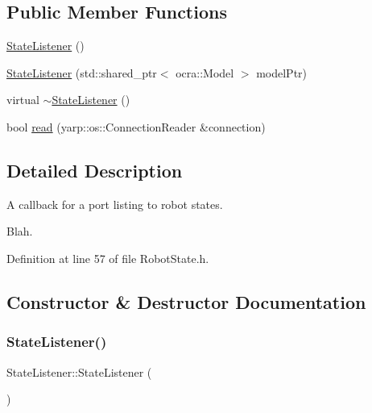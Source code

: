 \subsection*{Public Member Functions}
\begin{DoxyCompactItemize}
\item 
\hyperlink{classocra__recipes_1_1StateListener_ab2d5128398eeb9990f34a633e9a4e181}{State\+Listener} ()
\item 
\hyperlink{classocra__recipes_1_1StateListener_a6861fabf2b226ce71ba2bcfa766a4538}{State\+Listener} (std\+::shared\+\_\+ptr$<$ ocra\+::\+Model $>$ model\+Ptr)
\item 
virtual \hyperlink{classocra__recipes_1_1StateListener_a84961512f9533cc039ca2deefbabbb73}{$\sim$\+State\+Listener} ()
\item 
bool \hyperlink{classocra__recipes_1_1StateListener_a10196cebd253c4b98fb39371c95cc68a}{read} (yarp\+::os\+::\+Connection\+Reader \&connection)
\end{DoxyCompactItemize}


\subsection{Detailed Description}
A callback for a port listing to robot states. 

Blah. 

Definition at line 57 of file Robot\+State.\+h.



\subsection{Constructor \& Destructor Documentation}
\hypertarget{classocra__recipes_1_1StateListener_ab2d5128398eeb9990f34a633e9a4e181}{}\label{classocra__recipes_1_1StateListener_ab2d5128398eeb9990f34a633e9a4e181} 
\subsubsection{\texorpdfstring{State\+Listener()}{StateListener()}\hspace{0.1cm}{\footnotesize\ttfamily [1/2]}}
{\footnotesize\ttfamily State\+Listener\+::\+State\+Listener (\begin{DoxyParamCaption}{ }\end{DoxyParamCaption})}




